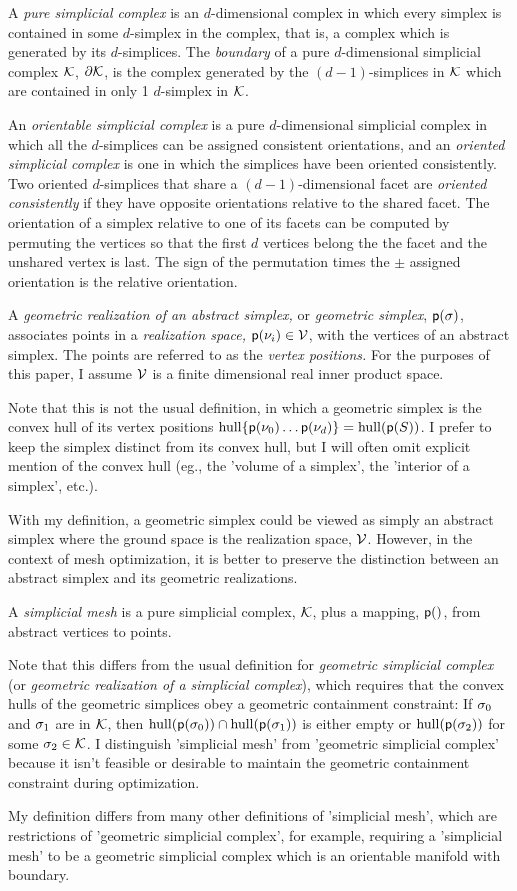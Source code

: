 A {\it pure simplicial complex} is an $d$-dimensional complex
in which every simplex is contained in some $d$-simplex in the complex,
that is, a complex which is generated by its $d$-simplices.
The {\it boundary} of a pure $d$-dimensional simplicial complex $\mathcal{K}$,
$\partial \mathcal{K}$,
is the complex generated by the $(d-1)$-simplices in $\mathcal{K}$
which are contained in only 1 $d$-simplex in $\mathcal{K}$.

An {\it orientable simplicial complex} is a pure $d$-dimensional simplicial complex
in which all the $d$-simplices can be assigned consistent orientations,
and an {\it oriented simplicial complex} is one in which the simplices
have been oriented consistently.
Two oriented $d$-simplices that share a $(d-1)$-dimensional facet
are {\it oriented consistently} if they have opposite orientations
relative to the shared facet. The orientation of a simplex relative to
one of its facets can be computed by permuting the vertices so that
the first $d$ vertices belong the the facet and the unshared vertex is last.
The sign of the permutation times the $\pm$ assigned orientation
is the relative orientation.




A {\it geometric realization of an abstract simplex,}
or {\it geometric simplex}, $\mathsf{p}(\sigma)$,  associates points
in a {\it realization space,}
$\mathsf{p} ( \nu_i ) \in \mathcal{V}$, with the vertices of an abstract simplex.
The points are referred to as the {\it vertex positions.}
For the purposes of this paper,
I assume $\mathcal{V}$ is
a finite dimensional real inner product space.

Note that this is not the usual definition,
in which a geometric simplex is the convex hull of its vertex positions
$\convex_span \{ \p(\Vvertex_0) \ldots \p(\Vvertex_d) \} = \convex_span ( \p(S) )$.
I prefer to keep the simplex distinct from its convex hull,
but I will often omit explicit mention of the convex hull
(eg., the 'volume of a simplex', the 'interior of a simplex', etc.).

With my definition,
a geometric simplex could be viewed as simply an abstract simplex
where the ground space is the realization space, $\mathcal{V}$.
However, in the context of mesh optimization,
it is better to preserve the distinction between an abstract simplex
and its geometric realizations.

A {\it simplicial mesh} is a pure simplicial complex, $\mathcal{K}$,
plus a mapping, $\mathsf{p}()$, from abstract vertices to points.

Note that this differs from the usual definition for
{\it geometric simplicial complex}
(or {\it geometric realization of a simplicial complex}),
which requires that the convex hulls of the geometric
simplices obey a geometric containment constraint:
If $\sigma_0$ and $\sigma_1$ are in $\mathcal{K}$,
then $\convex_span ( \p( \Ssimplex_0 ) ) \intersection
\convex_span ( \p( \Ssimplex_1 ) )$
is either empty or
$\convex_span ( \p( \Ssimplex_2 ) )$ for some $\sigma_2 \in \mathcal{K}$.
I distinguish 'simplicial mesh' from 'geometric simplicial complex'
because it isn't feasible or desirable to maintain the geometric
containment constraint during optimization.

My definition differs from many other definitions of 'simplicial mesh',
which are restrictions of 'geometric simplicial complex', for example,
requiring a 'simplicial mesh' to be a geometric simplicial complex
which is an orientable manifold with boundary.




